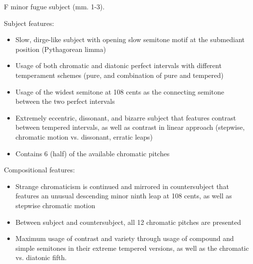 \begin{Example}[H]
    \begin{center}
    \caption{ F minor fugue subject (mm. 1-3). }
    \end{center}
\end{Example}
    

    \begin{center}
    \end{center}
    

    \begin{center}
    \end{center}
    


    \begin{center}
    \end{center}
    
    Subject features:

\begin{itemize}
\tightlist
\item
  Slow, dirge-like subject with opening slow semitone motif at the
  submediant position (Pythagorean limma)
\item
  Usage of both chromatic and diatonic perfect intervals with different
  temperament schemes (pure, and combination of pure and tempered)
\item
  Usage of the widest semitone at 108 cents as the connecting semitone
  between the two perfect intervals
\item
  Extremely eccentric, dissonant, and bizarre subject that features
  contrast between tempered intervals, as well as contrast in linear
  approach (stepwise, chromatic motion vs. dissonant, erratic leaps)
\item
  Contains 6 (half) of the available chromatic pitches
\end{itemize}

Compositional features:

\begin{itemize}
\tightlist
\item
  Strange chromaticism is continued and mirrored in countersubject that
  features an unusual descending minor ninth leap at 108 cents, as well
  as stepwise chromatic motion
\item
  Between subject and countersubject, all 12 chromatic pitches are
  presented
\item
  Maximum usage of contrast and variety through usage of compound and
  simple semitones in their extreme tempered versions, as well as the
  chromatic vs. diatonic fifth.
\end{itemize}

